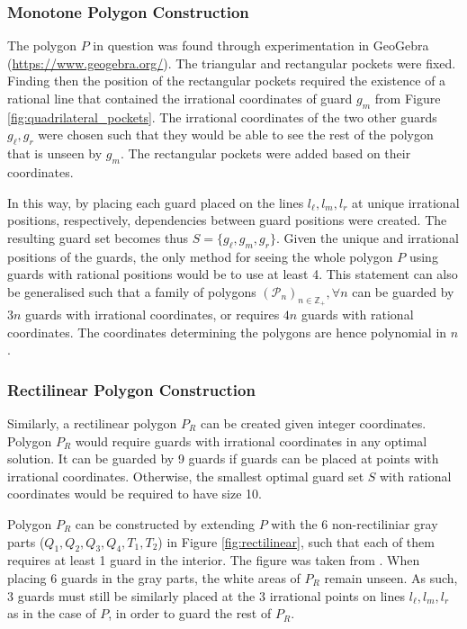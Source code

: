 \subsubsection{Monotone Polygon Construction}
The polygon $P$ in question  was found through experimentation in GeoGebra (\url{https://www.geogebra.org/}). The triangular and rectangular pockets were fixed. Finding then the position of the rectangular pockets required the existence of a rational line that contained the irrational coordinates of guard $g_m$ from Figure \ref{fig:quadrilateral_pockets}. The irrational coordinates of the two other guards $g_\ell, g_r$ were chosen such that they would be able to see the rest of the polygon that is unseen by $g_m$. The rectangular pockets were added based on their coordinates.

In this way, by placing each guard placed on the lines $l_\ell, l_m, l_r$ at unique irrational positions, respectively, dependencies between guard positions were created. The resulting guard set becomes thus $S = \{g_\ell, g_m, g_r\}$.  Given the unique and irrational positions of the guards, the only method for seeing the whole polygon $P$ using guards with rational positions would be to use at least 4. This statement can also be generalised such that a family of polygons $(\mathcal{P}_n)_{n \in \mathbb{Z}_+}, \forall n$ can be guarded by $3n$ guards with irrational coordinates, or requires $4n$ guards with rational coordinates. The coordinates determining the polygons are hence polynomial in $n$.

\subsubsection{Rectilinear Polygon Construction}
Similarly, a rectilinear polygon $P_R$ can be created given integer coordinates. Polygon $P_R$ would require guards with irrational coordinates in any optimal solution. It can be guarded by 9 guards if guards can be placed at points with irrational coordinates. Otherwise, the smallest optimal guard set $S$ with rational coordinates would be required to have size 10.

Polygon $P_R$ can be constructed by extending $P$ with the 6 non-rectiliniar gray parts ($Q_1, Q_2, Q_3, Q_4, T_1, T_2$) in Figure \ref{fig:rectilinear}, such that each of them requires at least 1 guard in the interior. The figure was taken from \cite{1057165}. When placing 6 guards in the gray parts, the white areas of $P_R$ remain unseen. As such, 3 guards must still be similarly placed at the 3 irrational points on lines $l_\ell, l_m, l_r$ as in the case of $P$, in order to guard the rest of $P_R$.

